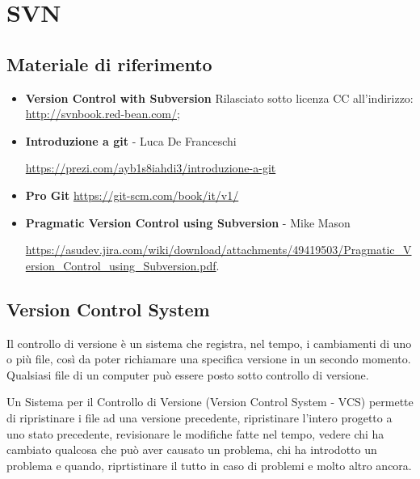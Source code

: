 \section{SVN}

\subsection*{Materiale di riferimento}

\begin{itemize}

\item \textbf{Version Control with Subversion} Rilasciato sotto licenza CC 
all'indirizzo:
 \url{http://svnbook.red-bean.com/};
\item \textbf{Introduzione a git} - Luca De Franceschi 

\url{https://prezi.com/ayb1s8iahdi3/introduzione-a-git}
 \item \textbf{Pro Git} \url{https://git-scm.com/book/it/v1/}
\item \textbf{Pragmatic Version Control using Subversion} - Mike Mason 

\url{https://asudev.jira.com/wiki/download/attachments/49419503/Pragmatic_Version_Control_using_Subversion.pdf}.

\end{itemize}

\subsection{Version Control System}
Il controllo di versione è un sistema che registra, nel tempo, i cambiamenti di uno o più file, così da poter richiamare una specifica versione in un secondo momento. Qualsiasi file di un computer può essere posto sotto controllo di versione.

Un Sistema per il Controllo di Versione (Version Control System - VCS)  permette di ripristinare i file ad una versione precedente, ripristinare l'intero progetto a uno stato precedente, revisionare le modifiche fatte nel tempo, vedere chi ha cambiato qualcosa che può aver causato un problema, chi ha introdotto un problema e quando, riprtistinare il tutto in caso di problemi e molto altro ancora. 

